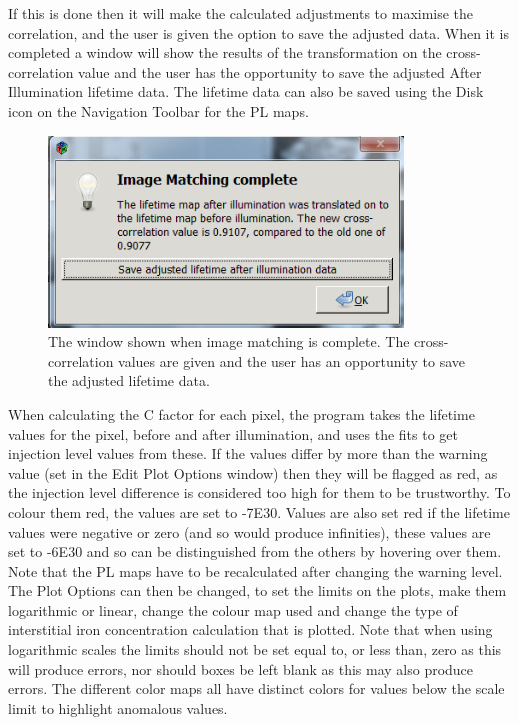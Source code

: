 \documentclass[final,a4paper,oneside,12pt]{article}
\begin{document}
If this is done then it will make the calculated adjustments to maximise the correlation, and the user is given the option to save the adjusted data. When it is completed a window will show the results of the transformation on the cross-correlation value and the user has the opportunity to save the adjusted After Illumination lifetime data. The lifetime data can also be saved using the Disk icon on the Navigation Toolbar for the PL maps.

\begin{figure}[h!]
\includegraphics[height=2in]{2imagematchingcomplete}
\caption{\label{figure2} The window shown when image matching is complete. The cross-correlation values are given and the user has an opportunity to save the adjusted lifetime data.}
\end{figure}


When calculating the C factor for each pixel, the program takes the lifetime values for the pixel, before and after illumination, and uses the fits to get injection level values from these. If the values differ by more than the warning value (set in the Edit Plot Options window) then they will be flagged as red, as the injection level difference is considered too high for them to be trustworthy. To colour them red, the values are set to -7E30. Values are also set red if the lifetime values were negative or zero (and so would produce infinities), these values are set to -6E30 and so can be distinguished from the others by hovering over them. Note that the PL maps have to be recalculated after changing the warning level.
\\
The Plot Options can then be changed, to set the limits on the plots, make them logarithmic or linear, change the colour map used and change the type of interstitial iron concentration calculation that is plotted. Note that when using logarithmic scales the limits should not be set equal to, or less than, zero as this will produce errors, nor should boxes be left blank as this may also produce errors. The different color maps all have distinct colors for values below the scale limit to highlight anomalous values.
\end{document}
